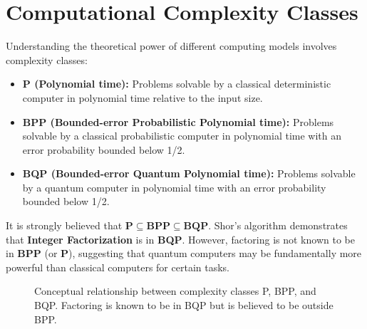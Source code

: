 \section{Computational Complexity Classes}\label{sec:complexity_classes}
Understanding the theoretical power of different computing models involves complexity classes:
\begin{itemize}
    \item \textbf{P (Polynomial time):} Problems solvable by a classical deterministic computer in polynomial time relative to the input size.
    \item \textbf{BPP (Bounded-error Probabilistic Polynomial time):} Problems solvable by a classical probabilistic computer in polynomial time with an error probability bounded below 1/2.
    \item \textbf{BQP (Bounded-error Quantum Polynomial time):} Problems solvable by a quantum computer in polynomial time with an error probability bounded below 1/2.
\end{itemize}
It is strongly believed that $\textbf{P} \subseteq \textbf{BPP} \subseteq \textbf{BQP}$. Shor's algorithm demonstrates that \textbf{Integer Factorization} is in \textbf{BQP}. However, factoring is not known to be in \textbf{BPP} (or \textbf{P}), suggesting that quantum computers may be fundamentally more powerful than classical computers for certain tasks.

\begin{figure}[h]
    \centering
    \caption{Conceptual relationship between complexity classes P, BPP, and BQP. Factoring is known to be in BQP but is believed to be outside BPP.}
    \label{fig:complexity_classes}
\end{figure}

